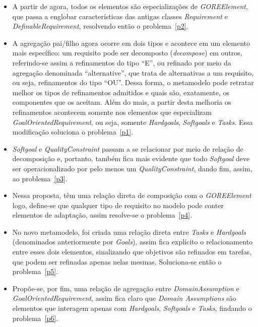 
\begin{itemize}
	\item A partir de agora, todos os elementos são especializações de \textit{GOREElement}, que passa a englobar características das antigas classes \textit{Requirement} e \textit{DefinableRequirement}, resolvendo então o problema~\ref{p2}. 

	\item A agregação pai/filho agora ocorre em dois tipos e acontece em um elemento mais específico: um requisito pode ser decomposto (\textit{decompose}) em outros, referindo-se assim a refinamentos do tipo ``E'', ou refinado por meio da agregação denominada ``alternative'', que trata de alternativas a um requisito, ou seja, refinamentos do tipo ``OU''. Dessa forma, o metamodelo pode retratar melhor os tipos de refinamentos admitidos e quais são, exatamente, os componentes que  os aceitam. Além do mais, a partir desta melhoria os refinamentos acontecem somente nos elementos que especializam \textit{GoalOrientedRequirement}, ou seja, somente \textit{Hardgoals}, \textit{Softgoals} e \textit{Tasks}. Essa modificação soluciona o problema~\ref{p1}.
	
	\item \textit{Softgoal} e \textit{QualityConstraint} passam a se relacionar por meio de relação de decomposição e, portanto, também fica mais evidente que todo \textit{Softgoal} deve ser operacionalizado por pelo menos um \textit{QualityConstraint}, dando fim, assim, ao problema~\ref{p3}.
	
	\item Nessa proposta, \awreqs têm uma relação direta de composição com o \textit{GOREElement} logo, define-se que qualquer tipo de requisito no modelo pode conter elementos de adaptação, assim resolve-se o problema~\ref{p4}.
	
	\item No novo metamodelo, foi criada uma relação direta entre \textit{Tasks} e \textit{Hardgoals} (denominados anteriormente por \textit{Goals}), assim fica explícito o relacionamento entre esses dois elementos, sinalizando que objetivos são refinados em tarefas, que podem ser refinadas apenas nelas mesmas. Soluciona-se então o problema~\ref{p5}.
	
	\item Propõe-se, por fim, uma relação de agregação entre \textit{DomainAssumption} e \textit{GoalOrientedRequirement}, assim fica claro que \textit{Domain Assumptions} são elementos que interagem apenas com \textit{Hardgoals}, \textit{Softgoals} e \textit{Tasks}, findando o problema~\ref{p6}.
	
\end{itemize}

